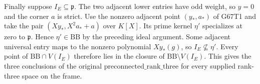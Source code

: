Finally suppose $I_E\subseteq\mathfrak p$. The two adjacent lower
entries have odd weight, so $y=0$ and the corner $a$ is strict.
Use the nonzero adjacent point $(y_*,a_*)$ of G67T1 and take the
pair $(X y_*,X^2a_*+a)$ over $K[X]$. Its prime kernel $\eta'$
specializes at zero to $\mathfrak p$. Hence $\eta'\in\mathrm{BB}$
by the preceding ideal argument. Some adjacent universal entry
maps to the nonzero polynomial $Xy_*(g)$, so
$I_E\not\subseteq\eta'$. Every point of $\mathrm{BB}\cap V(I_E)$
therefore lies in the closure of $\mathrm{BB}\setminus V(I_E)$.
This gives the three conclusions of the original
$\mathrm{preconnected\_rank\_three}$ for every supplied rank-three
space on the frame.
